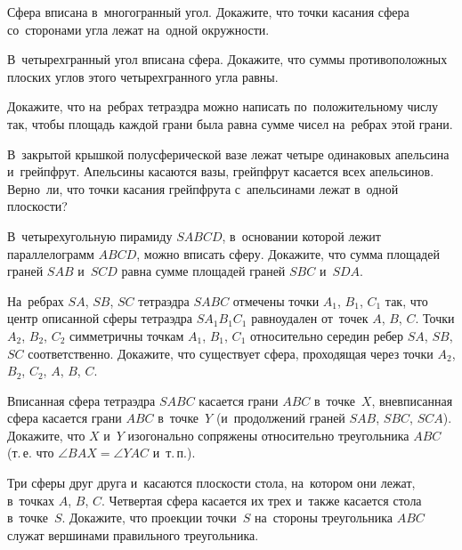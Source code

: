 


\begin{problems}

\item
Сфера вписана в~многогранный угол.
Докажите, что точки касания сфера со~сторонами угла лежат на~одной окружности.

\item
В~четырехгранный угол вписана сфера.
Докажите, что суммы противоположных плоских углов этого четырехгранного угла
равны.

\item
Докажите, что на~ребрах тетраэдра можно написать по~положительному числу так,
чтобы площадь каждой грани была равна сумме чисел на~ребрах этой грани.

\item
В~закрытой крышкой полусферической вазе лежат четыре одинаковых апельсина
и~грейпфрут.
Апельсины касаются вазы, грейпфрут касается всех апельсинов.
Верно~ли, что точки касания грейпфрута с~апельсинами лежат в~одной плоскости?

\item
В~четырехугольную пирамиду $SABCD$, в~основании которой лежит
параллелограмм $ABCD$, можно вписать сферу.
Докажите, что сумма площадей граней $SAB$ и~$SCD$ равна сумме площадей
граней $SBC$ и~$SDA$.

\item
На~ребрах $SA$, $SB$, $SC$ тетраэдра $SABC$ отмечены точки $A_1$, $B_1$, $C_1$
так, что центр описанной сферы тетраэдра $SA_{1}B_{1}C_{1}$ равноудален
от~точек $A$, $B$, $C$.
Точки $A_2$, $B_2$, $C_2$ симметричны точкам $A_1$, $B_1$, $C_1$ относительно
середин ребер $SA$, $SB$, $SC$ соответственно.
Докажите, что существует сфера, проходящая через
точки $A_2$, $B_2$, $C_2$, $A$, $B$, $C$.

\item
Вписанная сфера тетраэдра $SABC$ касается грани $ABC$ в~точке~$X$, вневписанная
сфера касается грани $ABC$ в~точке~$Y$
(и~продолжений граней $SAB$, $SBC$, $SCA$).
Докажите, что $X$ и~$Y$ изогонально сопряжены относительно треугольника $ABC$
(т.\,е. что $\angle BAX = \angle YAC$ и~т.\,п.).

\item
Три сферы друг друга и~касаются плоскости стола, на~котором они лежат,
в~точках $A$, $B$, $C$.
Четвертая сфера касается их трех и~также касается стола в~точке~$S$.
Докажите, что проекции точки~$S$ на~стороны треугольника $ABC$ служат вершинами
правильного треугольника.

\end{problems}

